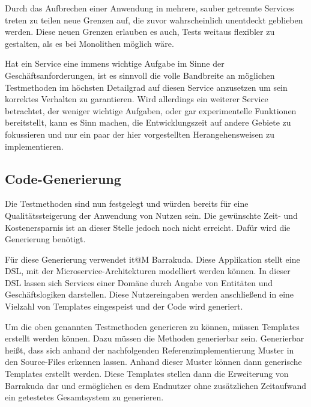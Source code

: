 \documentclass[12pt,a4paper,bibliography=totocnumbered,listof=totocnumbered]{scrartcl}
\begin{document}
Durch das Aufbrechen einer Anwendung in mehrere, sauber getrennte Services treten zu teilen neue Grenzen auf, die zuvor wahrscheinlich unentdeckt geblieben werden. Diese neuen Grenzen erlauben es auch, Tests weitaus flexibler zu gestalten, als es bei Monolithen möglich wäre.

Hat ein Service eine immens wichtige Aufgabe im Sinne der Geschäftsanforderungen, ist es sinnvoll die volle Bandbreite an möglichen Testmethoden im höchsten Detailgrad auf diesen Service anzusetzen um sein korrektes Verhalten zu garantieren. Wird allerdings ein weiterer Service betrachtet, der weniger wichtige Aufgaben, oder gar experimentelle Funktionen bereitstellt, kann es Sinn machen, die Entwicklungszeit auf andere Gebiete zu fokussieren und nur ein paar der hier vorgestellten Herangehensweisen zu implementieren.\cite{clemson}

\subsection{Code-Generierung}

Die Testmethoden sind nun festgelegt und würden bereits für eine Qualitätssteigerung der Anwendung von Nutzen sein. Die gewünschte Zeit- und Kostenersparnis ist an dieser Stelle jedoch noch nicht erreicht. Dafür wird die Generierung benötigt.

Für diese Generierung verwendet it@M Barrakuda. Diese Applikation stellt eine \acf{DSL}, mit der Microservice-Architekturen modelliert werden können. In dieser DSL lassen sich Services einer Domäne durch Angabe von Entitäten und Geschäftslogiken darstellen. Diese Nutzereingaben werden anschließend in eine Vielzahl von Templates eingespeist und der Code wird generiert.

Um die oben genannten Testmethoden generieren zu können, müssen Templates erstellt werden können. Dazu müssen die Methoden generierbar sein. Generierbar heißt, dass sich anhand der nachfolgenden Referenzimplementierung Muster in den Source-Files erkennen lassen. Anhand dieser Muster können dann generische Templates erstellt werden. Diese Templates stellen dann die Erweiterung von Barrakuda dar und ermöglichen es dem Endnutzer ohne zusätzlichen Zeitaufwand ein getestetes Gesamtsystem zu generieren.

\end{document}

